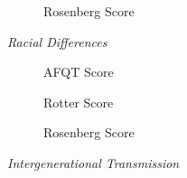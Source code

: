 \begin{frame}\begin{figure}[htp]\centering
\caption{Rosenberg Score}
\end{figure}\end{frame}
\begin{frame}\begin{center}
\LARGE\textit{Racial Differences}
\end{center}\end{frame}
\begin{frame}\begin{figure}[htp]\centering
\caption{AFQT Score}
\end{figure}\end{frame}
\begin{frame}\begin{figure}[htp]\centering
\caption{Rotter Score}
\end{figure}\end{frame}
\begin{frame}\begin{figure}[htp]\centering
\caption{Rosenberg Score}
\end{figure}\end{frame}
\begin{frame}\begin{center}
\LARGE\textit{Intergenerational Transmission}
\end{center}\end{frame}
